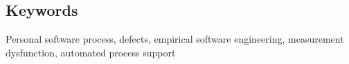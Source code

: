\subsection*{Keywords}

\noindent Personal software process, defects, 
empirical software engineering,
measurement dysfunction, automated process support\\




 

    
  


 






